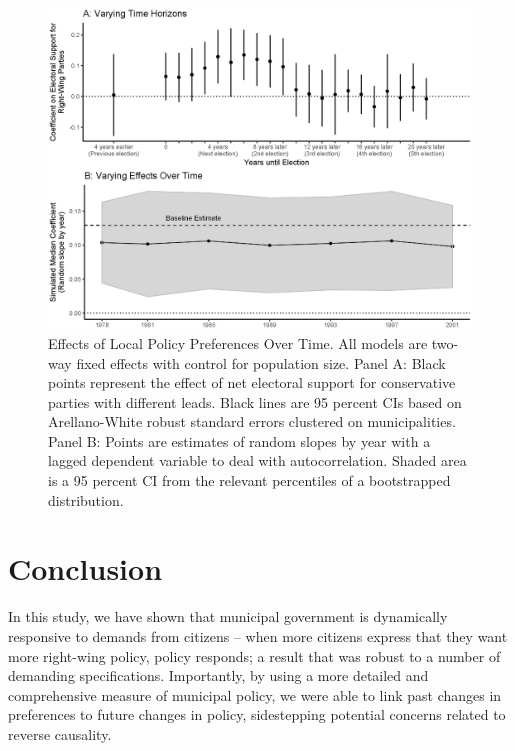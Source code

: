 \documentclass[a4paper,12pt]{article}
\begin{document}
\begin{figure}[htbp]
	\centering
	\includegraphics[scale = .6]{EffectsVsTime.eps}
	\caption{Effects of Local Policy Preferences Over Time. All models are two-way fixed effects with control for population size. Panel A: Black points represent the effect of net electoral support for conservative parties with different leads. Black lines are 95 percent CIs based on Arellano-White robust standard errors clustered on municipalities. Panel B: Points are estimates of random slopes by year with a lagged dependent variable to deal with autocorrelation. Shaded area is a 95 percent CI from the relevant percentiles of a bootstrapped distribution.}
	\label{fig:LongRun}
\end{figure}








\section*{Conclusion}

In this study, we have shown that municipal government is dynamically responsive to demands from citizens -- when more citizens express that they want more right-wing policy, policy responds; a result that was robust to a number of demanding specifications. Importantly, by using a more detailed and comprehensive measure of municipal policy, we were able to link past changes in preferences to future changes in policy, sidestepping potential concerns related to reverse causality. 
\end{document}
